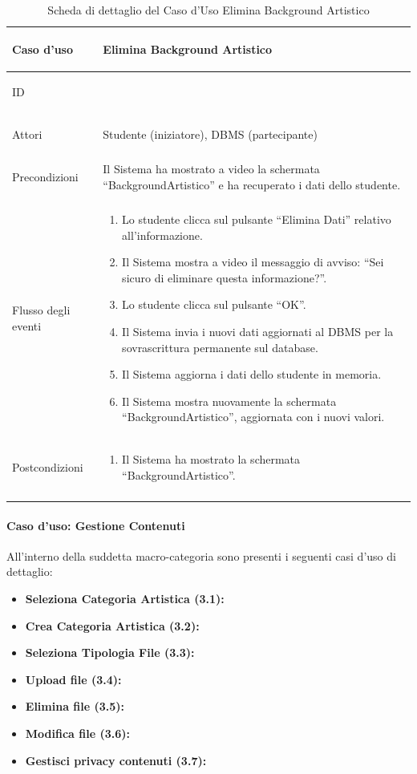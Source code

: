 \documentclass[12pt,a4paper]{article}
\begin{document}
\small
\begin{longtable}{|
>{\columncolor{unipablue}\color{white}\bfseries\raggedright\arraybackslash}p{3.4cm}|
>{\raggedright\arraybackslash}p{11.1cm}|}
\hline
Caso d’uso & Elimina Background Artistico \\ \hline
ID & 2.4 \\ \hline
Attori & Studente (iniziatore), DBMS (partecipante) \\ \hline
Precondizioni & Il Sistema ha mostrato a video la schermata ``BackgroundArtistico'' e ha recuperato i dati dello studente. \\ \hline
Flusso degli eventi &
\begin{enumerate}
    \item Lo studente clicca sul pulsante ``Elimina Dati'' relativo all'informazione.
    \item Il Sistema mostra a video il messaggio di avviso: ``Sei sicuro di eliminare questa informazione?''.
    \item Lo studente clicca sul pulsante ``OK''.
    \item Il Sistema invia i nuovi dati aggiornati al DBMS per la sovrascrittura permanente sul database.
    \item Il Sistema aggiorna i dati dello studente in memoria.
    \item Il Sistema mostra nuovamente la schermata ``BackgroundArtistico'', aggiornata con i nuovi valori.
\end{enumerate} \\ \hline
Postcondizioni &
\begin{enumerate}
    \item Il Sistema ha mostrato la schermata ``BackgroundArtistico''.
\end{enumerate} \\ \hline
\caption{Scheda di dettaglio del Caso d'Uso Elimina Background Artistico}
\label{tab:uc_elimina_background_artistico}\\
\end{longtable}
\normalsize

\newpage 

\paragraph{Caso d'uso: Gestione Contenuti}
All’interno della suddetta macro-categoria sono presenti i seguenti casi d’uso di dettaglio:
\begin{itemize}[topsep=0.25em,itemsep=0.1em,parsep=0pt,partopsep=0pt]
    \item \textbf{Seleziona Categoria Artistica (3.1):}
    \item \textbf{Crea Categoria Artistica (3.2):}
    \item \textbf{Seleziona Tipologia File (3.3):}
    \item \textbf{Upload file (3.4):} 
    \item \textbf{Elimina file (3.5):} 
    \item \textbf{Modifica file (3.6):} 
    \item \textbf{Gestisci privacy contenuti (3.7):} 

\end{itemize}
\end{document}

